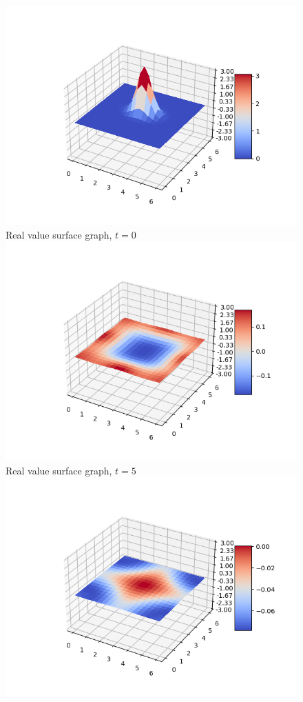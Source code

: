 \documentclass[a4paper,8pt]{article}
\begin{document}
\begin{figure}[h!]
\begin{multicols}{2}
\centering
\includegraphics[width=1\linewidth]{t0real}\\
Real value surface graph, $t=0$
\includegraphics[width=1\linewidth]{t5real}\\
Real value surface graph, $t=5$
\includegraphics[width=1\linewidth]{t10real}\\

\end{multicols}
\end{figure}
\end{document}
